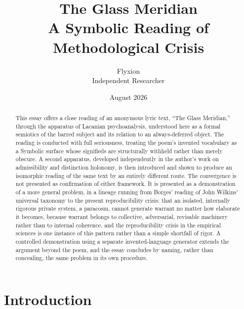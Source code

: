 \documentclass[11pt]{article}
\title{\textbf{The Glass Meridian}\\[4pt]\large A Symbolic Reading of Methodological Crisis}
\author{Flyxion\\\small Independent Researcher}
\date{August 2026}
\begin{document}
\maketitle

\begin{abstract}
\noindent This essay offers a close reading of an anonymous lyric text, ``The Glass Meridian,'' through the apparatus of Lacanian psychoanalysis, understood here as a formal semiotics of the barred subject and its relation to an always-deferred object. The reading is conducted with full seriousness, treating the poem's invented vocabulary as a Symbolic surface whose signifieds are structurally withheld rather than merely obscure. A second apparatus, developed independently in the author's work on admissibility and distinction holonomy, is then introduced and shown to produce an isomorphic reading of the same text by an entirely different route. The convergence is not presented as confirmation of either framework. It is presented as a demonstration of a more general problem, in a lineage running from Borges' reading of John Wilkins' universal taxonomy to the present reproducibility crisis: that an isolated, internally rigorous private system, a paracosm, cannot generate warrant no matter how elaborate it becomes, because warrant belongs to collective, adversarial, revisable machinery rather than to internal coherence, and the reproducibility crisis in the empirical sciences is one instance of this pattern rather than a simple shortfall of rigor. A controlled demonstration using a separate invented-language generator extends the argument beyond the poem, and the essay concludes by naming, rather than concealing, the same problem in its own procedure.
\end{abstract}

\section{Introduction}
\end{document}
